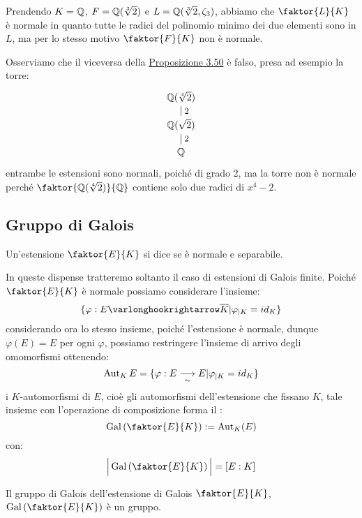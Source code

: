 \documentclass[11pt]{scrartcl}
\begin{document}
\begin{remark}
    Prendendo $K = \mathbb Q$, $F = \mathbb Q(\sqrt[3]{2})$ e $L = \mathbb Q(\sqrt[3]{2},\zeta_3)$, abbiamo che $\faktor{L}{K}$ è normale in quanto tutte le radici del polinomio minimo dei due elementi sono in $L$, ma per lo stesso motivo 
    $\faktor{F}{K}$ non è normale.
\end{remark}

\pagebreak

\begin{remark}
    Osserviamo che il viceversa della \hyperref[3.50]{Proposizione 3.50} è falso, presa ad esempio la torre:\
    \[ \begin{tikzpicture}
    \node (Q1) at (0,-1) {$\QQ$};
    \node (Q3) at (0,0) {$\QQ(\sqrt{2})$};
    \node (Q4) at (0,1) {$\QQ(\sqrt[4]{2})$};
    \draw (Q4)--(Q3) node [right, yshift=-0.5cm] {\small$2$};
    \draw (Q1)--(Q3) node [right, yshift=0.5cm] {\small$2$};
    \end{tikzpicture}
        \]
    entrambe le estensioni sono normali, poiché di grado 2, ma la torre non è normale perché $\faktor{\QQ(\sqrt[4]{2})}{\QQ}$ contiene solo due radici di $x^4-2$.
\end{remark}

\newpage
\subsection{Gruppo di Galois}
\begin{definition}
    Un'estensione $\faktor{E}{K}$ si dice  se è normale e separabile.
\end{definition}

In queste dispense tratteremo soltanto il caso di estensioni di Galois finite.
Poiché $\faktor{E}{K}$ è normale possiamo considerare l'insieme:
\[ \{\varphi : E \varlonghookrightarrow \overline K| \varphi_{|K} = id_K\}
    \]
considerando ora lo stesso insieme, poiché l'estensione è normale, dunque $\varphi(E) = E$ per ogni $\varphi$, possiamo restringere l'insieme di arrivo degli omomorfismi ottenendo:
\[ \operatorname{Aut}_K E = \{\varphi : E \underset{\sim}{\longrightarrow} E| \varphi_{|K} = id_K\}
    \]
i $K$-automorfismi di $E$, cioè gli automorfismi dell'estensione che fissano $K$, tale insieme con l'operazione di composizione forma il :
\[ \Gal\left(\faktor{E}{K}\right) := \Aut_K(E)
    \]
con:
\[ \Big|\Gal\left(\faktor{E}{K}\right)\Big| = [E : K]
    \]

\begin{proposition}
    Il gruppo di Galois dell'estensione di Galois $\faktor{E}{K}$, $\Gal\left(\faktor{E}{K}\right)$ è un gruppo.
\end{proposition}
\end{document}
